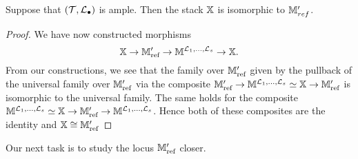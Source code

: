 \documentclass[12pt]{amsart}
\begin{document}
\begin{theorem}\label{thm:mref}
Suppose that $(\mathcal{T},\mathcal{L}_{\bullet})$ is ample. Then the stack $\mathbb{X}$ is isomorphic to $\mathbb{M}_{ref}'$.
\end{theorem}

\begin{proof}
We have now constructed morphisms 
$$ \mathbb{X} \rightarrow \mathbb{M}_{\text{ref}}' \rightarrow \mathbb{M}^{\mathcal{L}_1,\ldots,\mathcal{L}_s} \rightarrow \mathbb{X}.$$
From our constructions, we see that the family over $\mathbb{M}_{\text{ref}}'$ given by the pullback of the universal family over $\mathbb{M}_{\text{ref}}'$ via the composite $\mathbb{M}_{\text{ref}}' \rightarrow \mathbb{M}^{\mathcal{L}_1,\ldots,\mathcal{L}_s} \simeq \mathbb{X} \rightarrow \mathbb{M}_{\text{ref}}'$ is isomorphic to the universal family. 
The same holds for the composite $\mathbb{M}^{\mathcal{L}_1,\ldots,\mathcal{L}_s} \simeq \mathbb{X} \rightarrow \mathbb{M}_{\text{ref}}' \rightarrow \mathbb{M}^{\mathcal{L}_1,\ldots,\mathcal{L}_s}$. 
Hence both of these composites are the identity and $\mathbb{X} \cong \mathbb{M}_{\text{ref}}'$
\end{proof}

 



Our next task is to study the locus $\mathbb{M}_{\text{ref}}'$ closer.
\end{document}
